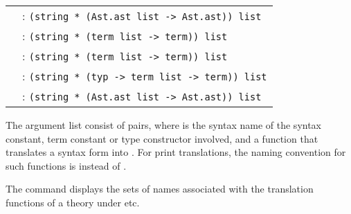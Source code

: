 \begin{isabellebody}
\begin{isamarkuptext}
  \medskip
  {\small
  \begin{tabular}{ll}
  \hyperlink{command.parse-ast-translation}{\mbox{\isa{\isacommand{parse{\isaliteral{5F}{\isacharunderscore}}ast{\isaliteral{5F}{\isacharunderscore}}translation}}}} & : \verb|(string * (Ast.ast list -> Ast.ast)) list| \\
  \hyperlink{command.parse-translation}{\mbox{\isa{\isacommand{parse{\isaliteral{5F}{\isacharunderscore}}translation}}}} & : \verb|(string * (term list -> term)) list| \\
  \hyperlink{command.print-translation}{\mbox{\isa{\isacommand{print{\isaliteral{5F}{\isacharunderscore}}translation}}}} & : \verb|(string * (term list -> term)) list| \\
  \hyperlink{command.typed-print-translation}{\mbox{\isa{\isacommand{typed{\isaliteral{5F}{\isacharunderscore}}print{\isaliteral{5F}{\isacharunderscore}}translation}}}} & : \verb|(string * (typ -> term list -> term)) list| \\
  \hyperlink{command.print-ast-translation}{\mbox{\isa{\isacommand{print{\isaliteral{5F}{\isacharunderscore}}ast{\isaliteral{5F}{\isacharunderscore}}translation}}}} & : \verb|(string * (Ast.ast list -> Ast.ast)) list| \\
  \end{tabular}}
  \medskip

  The argument list consist of  pairs, where  is the syntax name of the syntax constant, term constant or
  type constructor involved, and  a function that
  translates a syntax form  into .
  For print translations, the naming convention for such functions is
   instead of .

  The \hyperlink{command.print-syntax}{\mbox{}} command displays the sets of names
  associated with the translation functions of a theory under  etc.


\end{isamarkuptext}
\end{isabellebody}
